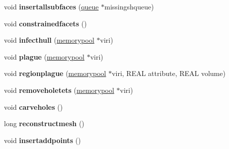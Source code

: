 \begin{DoxyCompactItemize}
\item 
\mbox{\label{classStemMesh3D_1_1tetgenmesh_a10bfe5a66d5fe4b8b5e6923be6aeda81}} 
void {\bfseries insertallsubfaces} (\hyperlink{classStemMesh3D_1_1tetgenmesh_1_1queue}{queue} $\ast$missingshqueue)
\item 
\mbox{\label{classStemMesh3D_1_1tetgenmesh_a62a63159ea74108d474876b9d353e31f}} 
void {\bfseries constrainedfacets} ()
\item 
\mbox{\label{classStemMesh3D_1_1tetgenmesh_a53f6fce97bc33230dc3cbc898a0d9d95}} 
void {\bfseries infecthull} (\hyperlink{classStemMesh3D_1_1tetgenmesh_1_1memorypool}{memorypool} $\ast$viri)
\item 
\mbox{\label{classStemMesh3D_1_1tetgenmesh_addf2a3a776d359c93e77ea0d036dd9d6}} 
void {\bfseries plague} (\hyperlink{classStemMesh3D_1_1tetgenmesh_1_1memorypool}{memorypool} $\ast$viri)
\item 
\mbox{\label{classStemMesh3D_1_1tetgenmesh_ae41d566b8efdc06c87a749c57507f77b}} 
void {\bfseries regionplague} (\hyperlink{classStemMesh3D_1_1tetgenmesh_1_1memorypool}{memorypool} $\ast$viri, R\+E\+AL attribute, R\+E\+AL volume)
\item 
\mbox{\label{classStemMesh3D_1_1tetgenmesh_a4ee15afb571af9bf74f6ca5e4ceac67e}} 
void {\bfseries removeholetets} (\hyperlink{classStemMesh3D_1_1tetgenmesh_1_1memorypool}{memorypool} $\ast$viri)
\item 
\mbox{\label{classStemMesh3D_1_1tetgenmesh_a65445b66176fbe5d52f7d488ff758007}} 
void {\bfseries carveholes} ()
\item 
\mbox{\label{classStemMesh3D_1_1tetgenmesh_a870abb2dd9338ce6d07c64e485a07fea}} 
long {\bfseries reconstructmesh} ()
\item 
\mbox{\label{classStemMesh3D_1_1tetgenmesh_abd315e0a08f7a538d5af5ea2d38be77e}} 
void {\bfseries insertaddpoints} ()
\item 

\end{DoxyCompactItemize}
